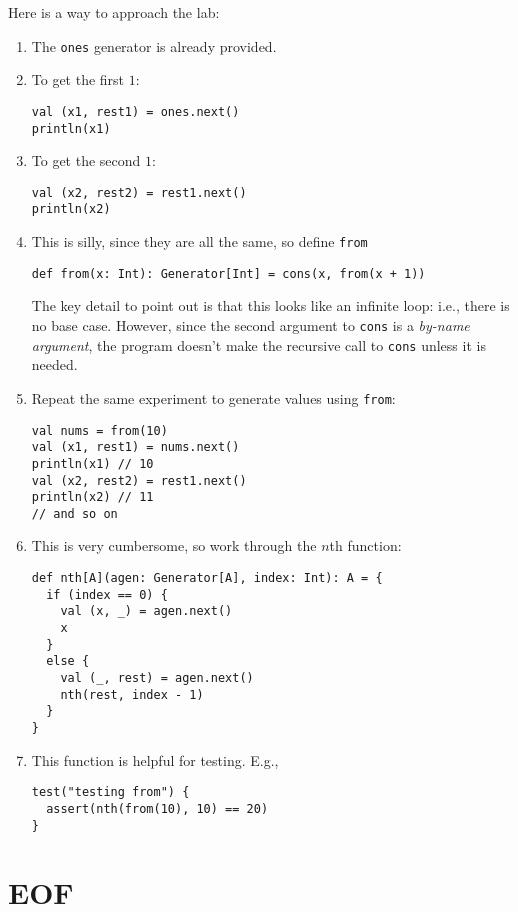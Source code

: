 \documentclass[9pt]{extbook}
\begin{document}
Here is a way to approach the lab:

\begin{enumerate}

\item The \lstinline|ones| generator is already provided.

\item To get the first $1$:

\begin{lstlisting}
val (x1, rest1) = ones.next()
println(x1)
\end{lstlisting}

\item To get the second $1$:

\begin{lstlisting}
val (x2, rest2) = rest1.next()
println(x2)
\end{lstlisting}

\item This is silly, since they are all the same, so define \lstinline|from|

\begin{lstlisting}
def from(x: Int): Generator[Int] = cons(x, from(x + 1))
\end{lstlisting}

The key detail to point out is that this looks like an infinite loop: i.e.,
there is no base case. However, since the second argument to
\lstinline|cons| is a \emph{by-name argument}, the program doesn't make the
recursive call to \lstinline|cons| unless it is needed.

\item Repeat the same experiment to generate values using \lstinline|from|:

\begin{lstlisting}
val nums = from(10)
val (x1, rest1) = nums.next()
println(x1) // 10
val (x2, rest2) = rest1.next()
println(x2) // 11
// and so on
\end{lstlisting}

\item This is very cumbersome, so work through the $n$th function:
  
\begin{lstlisting}
def nth[A](agen: Generator[A], index: Int): A = {
  if (index == 0) {
    val (x, _) = agen.next()
    x
  }
  else {
    val (_, rest) = agen.next()
    nth(rest, index - 1)
  }
}
\end{lstlisting}

\item This function is helpful for testing. E.g.,

\begin{lstlisting}
test("testing from") {
  assert(nth(from(10), 10) == 20)
}
\end{lstlisting}

\end{enumerate}

\chapter{EOF}
\end{document}
